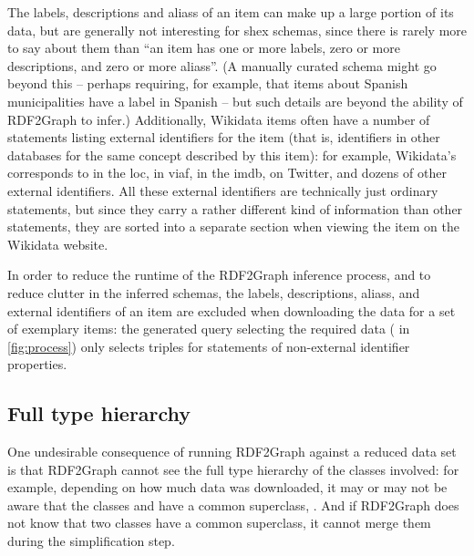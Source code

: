 The \glspl{label}, \glspl{description} and \glspl{alias} of an \gls{item} can make up a large portion of its data,
but are generally not interesting for \gls{shex} \glspl{schema},
since there is rarely more to say about them than
“an \gls{item} has one or more \glspl{label}, zero or more \glspl{description}, and zero or more \glspl{alias}”.
(A manually curated \gls{schema} might go beyond this –
perhaps requiring, for example, that \glspl{item} about Spanish municipalities have a label in Spanish –
but such details are beyond the ability of \gls{RDF2Graph} to infer.)
Additionally, \gls{Wikidata} \glspl{item} often have a number of \glspl{statement} listing external identifiers for the \gls{item}
(that is, identifiers in other databases for the same concept described by this \gls{item}):
for example, \gls{Wikidata}’s  corresponds to  in the \gls{loc},
 in \gls{viaf},
 in the \gls{imdb},
 on Twitter,
and dozens of other external identifiers.
All these external identifiers are technically just ordinary \glspl{statement},
but since they carry a rather different kind of information than other \glspl{statement},
they are sorted into a separate section when viewing the \gls{item} on the \gls{Wikidata} website.

In order to reduce the runtime of the \gls{RDF2Graph} inference process,
and to reduce clutter in the inferred \glspl{schema},
the \glspl{label}, \glspl{description}, \glspl{alias}, and external identifiers of an \gls{item}
are excluded when downloading the data for a set of exemplary \glspl{item}:
the generated query selecting the required data
( in \cref{fig:process})
only selects triples for statements of non-external identifier properties.

\subsection{Full type hierarchy}
\label{subsec:RDF2Graph+Wikidata:Wikidata:hierarchy}

One undesirable consequence of running \gls{RDF2Graph} against a reduced data set
is that \gls{RDF2Graph} cannot see the full type hierarchy of the classes involved:
for example, depending on how much data was downloaded,
it may or may not be aware that the classes  and 
have a common superclass, .
And if \gls{RDF2Graph} does not know that two classes have a common superclass,
it cannot merge them during the simplification step.

